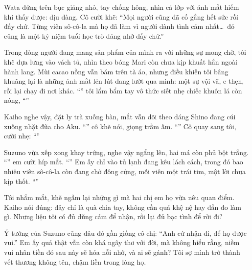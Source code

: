 \documentclass[../main.tex]{subfiles}
\begin{document}
Wata đứng trên bục giảng nhỏ, tay chống hông, nhìn cả lớp với ánh mắt hiếm khi thấy được: dịu dàng. Cô cười khẽ: ``Mọi người cũng đã cố gắng hết sức rồi đấy chứ. Từng viên sô-cô-la mà họ đã làm vì người dành tình cảm nhất\dots\ đó cũng là một kỷ niệm tuổi học trò đáng nhớ đấy chứ.''

Trong dòng người đang mang sản phẩm của mình ra với những sự mong chờ, tôi khẽ dựa lưng vào vách tủ, nhìn theo bóng Mari còn chưa kịp khuất hẳn ngoài hành lang. Mùi cacao nồng vẫn bám trên tà áo, nhưng điều khiến tôi bâng khuâng lại là những ánh mắt lén lút đang lướt qua mình: một sự vội vã, e thẹn, rồi lại chạy đi nơi khác. ``'' tôi lẩm bẩm tay vô thức siết nhẹ chiếc khuôn lá còn nóng, ``''

Kaiho nghe vậy, đặt ly trà xuống bàn, mắt vẫn dõi theo dáng Shino đang cúi xuống nhặt đũa cho Aku. ``'' cô khẽ nói, giọng trầm ấm. ``'' Cô quay sang tôi, cười nhẹ: ``''

Suzuno vừa xếp xong khay trứng, nghe vậy ngẩng lên, hai má còn phủ bột trắng. ``'' em cười híp mắt. ``'' Em ấy chỉ vào tủ lạnh đang kêu lách cách, trong đó bao nhiêu viên sô-cô-la còn đang chờ đông cứng, mỗi viên một trái tim, một lời chưa kịp thốt. ``''

Tôi nhắm mắt, khẽ ngẫm lại những gì mà hai chị em họ vừa nêu quan điểm. Kaiho nói đúng: đây chỉ là quà chia tay, không cần quá khệ nệ hay đắn đo làm gì. Nhưng liệu tôi có đủ dũng cảm để nhận, rồi lại đủ bạc tình để rời đi?

Ý tưởng của Suzuno cũng đâu đó gần giống cô chị: ``Anh cứ nhận đi, để họ được vui.'' Em ấy quả thật vẫn còn khá ngây thơ với đời, mà không hiểu rằng, niềm vui nhãn tiền đó sau này sẽ hóa nỗi nhớ, và ai sẽ gánh? Tôi sợ mình trở thành vết thương không tên, chậm liền trong lòng họ.
\end{document}
